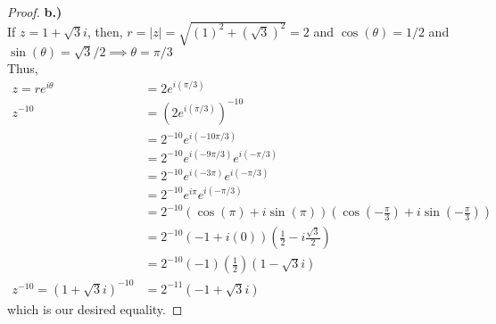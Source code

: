 \documentclass[10pt,a4paper]{article}
\begin{document}
\begin{proof}{\textbf{b.)}}
\\If $z = 1 + \sqrt{3}i$, then, $r = |z| = \sqrt{(1)^2 + (\sqrt{3})^2} = 2$ and $\cos(\theta) = 1/2$ and $\sin(\theta) = \sqrt{3}/2 \implies \theta = \pi/3$\\
Thus,
\begin{align*}
z = re^{i\theta} &= 2e^{i(\pi/3)}\\
z^{-10} &= (2e^{i(\pi/3)})^{-10}\\
&= 2^{-10}e^{i(-10\pi/3)}\\
&= 2^{-10}e^{i(-9\pi/3)}e^{i(-\pi/3)}\\
&= 2^{-10}e^{i(-3\pi)}e^{i(-\pi/3)}\\
&= 2^{-10}e^{i\pi}e^{i(-\pi/3)}\\
&= 2^{-10}(\cos(\pi) + i\sin(\pi))(\cos(-\frac{\pi}{3}) + i\sin(-\frac{\pi}{3}))\\
&= 2^{-10}(-1 + i(0))(\frac{1}{2} - i\frac{\sqrt{3}}{2})\\
&= 2^{-10}(-1)(\frac{1}{2})(1 - \sqrt{3}i)\\
z^{-10} = (1 + \sqrt{3}i)^{-10} &= 2^{-11}(-1 + \sqrt{3}i)
\end{align*}
which is our desired equality.
\end{proof}
\end{document}
